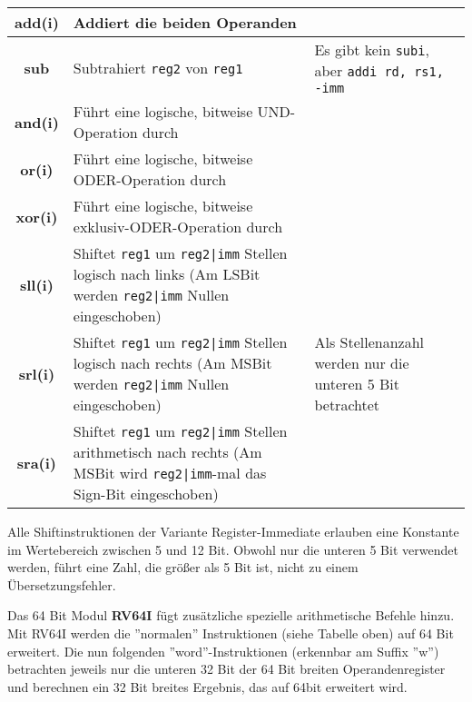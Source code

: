 \begin{tabular}{|c|p{8cm}|p{4cm}|}
	\hline
	\textbf{add(i)} & Addiert die beiden Operanden & \\
	\hline
	\textbf{sub} & Subtrahiert \texttt{reg2} von \texttt{reg1}& Es gibt kein \texttt{subi}, aber \texttt{addi rd, rs1, -imm} \\
	\hline
	\textbf{and(i)} & Führt eine logische, bitweise UND-Operation durch & \\
	\hline
	\textbf{or(i)} & Führt eine logische, bitweise ODER-Operation durch & \\
	\hline
	\textbf{xor(i)} & Führt eine logische, bitweise exklusiv-ODER-Operation durch & \\
	\hline
	\textbf{sll(i)} & Shiftet \texttt{reg1} um \texttt{reg2|imm} Stellen logisch nach links (Am LSBit werden \texttt{reg2|imm} Nullen eingeschoben) & \multirow{3}{4cm}{Als Stellenanzahl werden nur die unteren 5 Bit betrachtet} \\
	\cline{1-2}
	\textbf{srl(i)} & Shiftet \texttt{reg1} um \texttt{reg2|imm} Stellen logisch nach rechts (Am MSBit werden \texttt{reg2|imm} Nullen eingeschoben) & \\
	\cline{1-2}
	\textbf{sra(i)} & Shiftet \texttt{reg1} um \texttt{reg2|imm} Stellen arithmetisch nach rechts (Am MSBit wird \texttt{reg2|imm}-mal das Sign-Bit eingeschoben) & \\
	\hline
\end{tabular}

\begin{warningblock}
Alle Shiftinstruktionen der Variante Register-Immediate erlauben eine
Konstante im Wertebereich zwischen 5 und 12 Bit. Obwohl nur die unteren 5 Bit
verwendet werden, führt eine Zahl, die größer als 5 Bit ist, nicht zu einem
Übersetzungsfehler.
\end{warningblock}

Das 64 Bit Modul \textbf{RV64I} fügt zusätzliche spezielle arithmetische Befehle
hinzu. Mit RV64I werden die ''normalen'' Instruktionen (siehe Tabelle oben) auf
64 Bit erweitert. Die nun folgenden ''word''-Instruktionen (erkennbar am Suffix
''w'') betrachten jeweils nur die unteren 32 Bit der 64 Bit breiten
Operandenregister und berechnen ein 32 Bit breites Ergebnis, das auf 64bit
erweitert wird.\\


